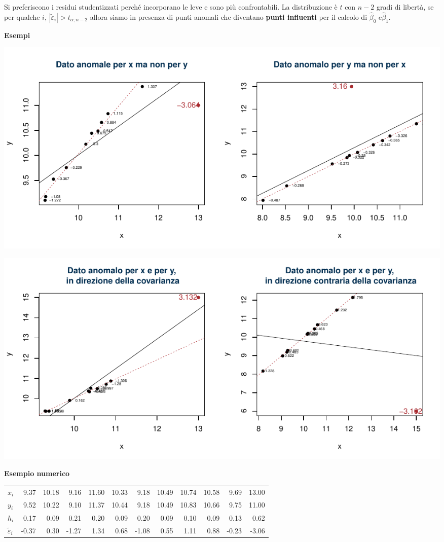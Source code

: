\documentclass[
  11pt,
]{book}
\theoremstyle{mytheoremstyle}
\theoremstyle{mydefstyle}
\begin{document}
Si preferiscono i residui studentizzati perché incorporano
le leve e sono più confrontabili.
La distribuzione è \(t\) con \(n-2\) gradi di libertà,
se per qualche \(i\), \(|\tilde{\varepsilon}_{i}|>t_{\alpha;n-2}\) allora siamo in presenza di punti anomali che diventano \textbf{punti influenti} per il calcolo di \(\hat\beta_0\) e\(\hat\beta_1\).

\textbf{Esempi}

\begin{center}\includegraphics{Appunti_di_Statistica_2025_files/figure-latex/18-regressione-II-27-1} \end{center}

\begin{center}\includegraphics{Appunti_di_Statistica_2025_files/figure-latex/18-regressione-II-28-1} \end{center}

\textbf{Esempio numerico}

\begin{tabular}{lrrrrrrrrrr>{}r}
\toprule
$x_i$ & 9.37 & 10.18 & 9.16 & 11.60 & 10.33 & 9.18 & 10.49 & 10.74 & 10.58 & 9.69 & \textcolor[HTML]{AB292E}{13.00}\\
$y_i$ & 9.52 & 10.22 & 9.10 & 11.37 & 10.44 & 9.18 & 10.49 & 10.83 & 10.66 & 9.75 & \textcolor[HTML]{AB292E}{11.00}\\
$h_i$ & 0.17 & 0.09 & 0.21 & 0.20 & 0.09 & 0.20 & 0.09 & 0.10 & 0.09 & 0.13 & \textcolor[HTML]{AB292E}{0.62}\\
$\tilde\varepsilon_i$ & -0.37 & 0.30 & -1.27 & 1.34 & 0.68 & -1.08 & 0.55 & 1.11 & 0.88 & -0.23 & \textcolor[HTML]{AB292E}{-3.06}\\
\bottomrule
\end{tabular}
\end{document}
